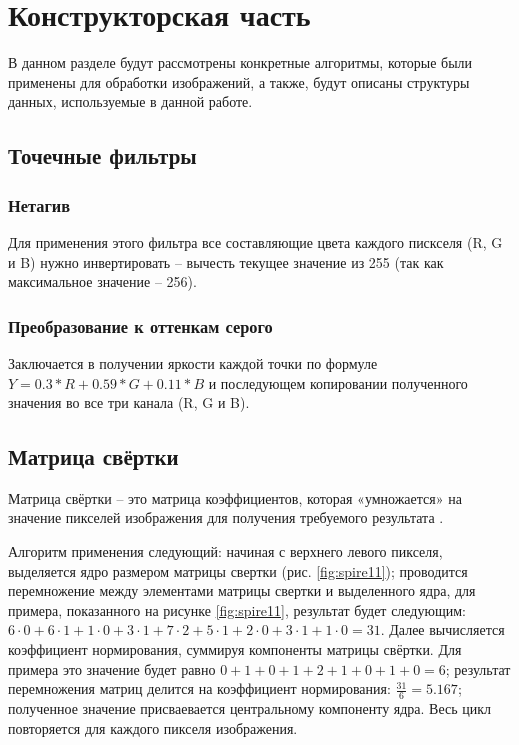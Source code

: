 \section{Конструкторская часть}

В данном разделе будут рассмотрены конкретные алгоритмы, которые были применены для обработки изображений, а также, будут описаны структуры данных, используемые в данной работе.

\subsection{Точечные фильтры}
\subsubsection{Нетагив}

Для применения этого фильтра все составляющие цвета каждого пискселя (R, G и B) нужно инвертировать -- вычесть текущее значение из 255 (так как максимальное значение -- 256).

\subsubsection{Преобразование к оттенкам серого}

Заключается в получении яркости каждой точки по формуле $Y = 0.3 * R + 0.59 * G + 0.11 * B$ и последующем копировании полученного значения во все три канала (R, G и B).

\subsection{Матрица свёртки}
Матрица свёртки -- это матрица коэффициентов, которая «умножается» на значение пикселей изображения для получения требуемого результата \cite{convolition}. 

Алгоритм применения следующий: начиная с верхнего левого пикселя, выделяется ядро размером матрицы свертки (рис. \ref{fig:spire11}); проводится перемножение между элементами матрицы свертки и выделенного ядра, для примера, показанного на рисунке \ref{fig:spire11}, результат будет следующим: $6\cdot0+6\cdot1+1\cdot0+3\cdot1+7\cdot2+5\cdot1+2\cdot0+3\cdot1+1\cdot0=31$. Далее вычисляется коэффициент нормирования, суммируя компоненты матрицы свёртки. Для примера это значение будет равно $0+1+0+1+2+1+0+1+0=6$; результат перемножения матриц делится на коэффициент нормирования: $\frac{31}{6}=5.167$; полученное значение присваевается центральному компоненту ядра. Весь цикл повторяется для каждого пикселя изображения.

